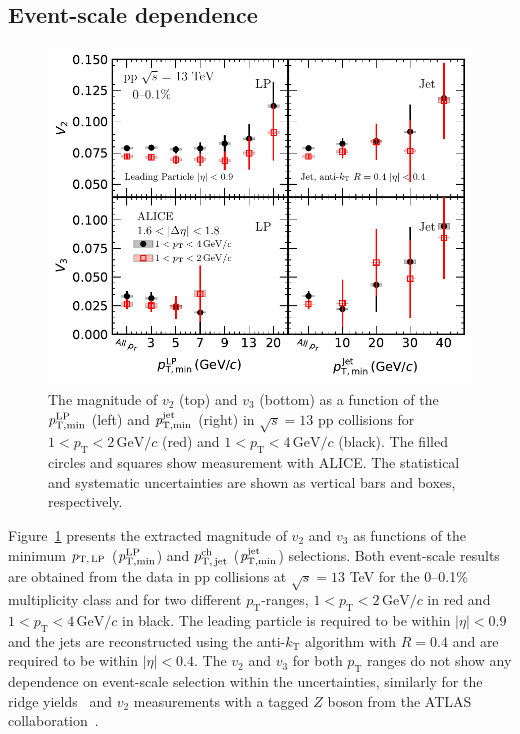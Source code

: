 \subsection{Event-scale dependence}
\begin{figure}[h!]
	\centering
	\includegraphics[width=0.99 \textwidth]{figures/Fig4_vn_LP.pdf}
	\caption{The magnitude of $v_2$ (top) and $v_3$ (bottom) as a function of the $\it{p}^{\rm{LP}}_{\rm{T,min}}$ (left) and $\it{p}^{\rm{jet}}_{\rm{T,min}}$ (right) in $\sqrt{s}=13$ pp collisions for $1<p_{\mathrm{T}}<2\,\mathrm{GeV}/c$ (red) and $1<p_{\mathrm{T}}<4\,\mathrm{GeV}/c$ (black). The filled circles and squares show measurement with ALICE. The statistical and systematic uncertainties are shown as vertical bars and boxes, respectively.}
	\label{fig:LPjet23}
\end{figure}    

Figure~\ref{fig:LPjet23} presents the extracted magnitude of $v_2$ and $v_3$ as functions of the minimum $p_\mathrm{T,\,LP}$ ($\it{p}^{\rm{LP}}_{\rm{T,min}}$) and $p_\mathrm{T,\,jet}^\mathrm{ch}$ ($\it{p}^{\rm{jet}}_{\rm{T,min}}$) selections. Both event-scale results are obtained from the data in pp collisions at $\sqrt{s}= 13$ TeV for the 0--0.1\% multiplicity class and for two different $p_\mathrm{T}$-ranges, $1<p_{\mathrm{T}}<2\,\mathrm{GeV}/c$ in red and $1<p_{\mathrm{T}}<4\,\mathrm{GeV}/c$ in black. The leading particle is required to be within $|\eta|<0.9$ and the jets are reconstructed using the anti-$k_\mathrm{T}$ algorithm with $R=0.4$ and are required to be within $|\eta|<0.4$. The $v_2$ and $v_3$ for both $p_\mathrm{T}$ ranges do not show any dependence on event-scale selection within the uncertainties, similarly for the ridge yields~\cite{ALICE:2021nir} and $v_{2}$ measurements  with a tagged $Z$ boson from the ATLAS collaboration~\cite{Aaboud:2019mcw}.

